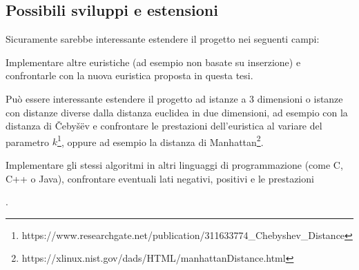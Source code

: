 \documentclass[a4paper,12pt]{report}
\begin{document}
\subsection{Possibili sviluppi e estensioni}
Sicuramente sarebbe interessante estendere il progetto nei seguenti campi:
\begin{legal}
  \item Implementare altre euristiche (ad esempio non basate su inserzione) e confrontarle con la nuova euristica proposta in questa tesi.
  \item Può essere interessante estendere il progetto ad istanze a 3 dimensioni o istanze con distanze diverse dalla distanza euclidea in due dimensioni, ad esempio con la distanza di Čebyšëv e confrontare le prestazioni dell'euristica al variare del parametro $k$\footnote{https://www.researchgate.net/publication/311633774\_Chebyshev\_Distance}, oppure ad esempio la distanza di Manhattan\footnote{https://xlinux.nist.gov/dads/HTML/manhattanDistance.html}.
  \item Implementare gli stessi algoritmi in altri linguaggi di programmazione (come C, C++ o Java), confrontare eventuali lati negativi, positivi e le prestazioni
\end{legal}.
 
%
%
\end{document}
